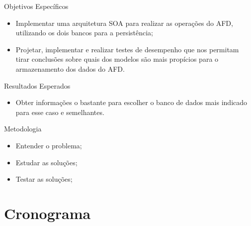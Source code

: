 \begin{frame}{Objetivos Específicos}
    \begin{itemize}
    \item Implementar uma arquitetura SOA para realizar as operações do AFD, utilizando os dois bancos para a persistência;
   \item Projetar, implementar e realizar testes de desempenho que nos permitam tirar conclusões sobre quais dos modelos são mais propícios para o armazenamento dos dados do AFD.
    \end{itemize}
\end{frame}

\begin{frame}{Resultados Esperados}
    \begin{itemize}
    \item Obter informações o bastante para escolher o banco de dados mais indicado para esse caso e semelhantes.
    \end{itemize}
\end{frame}


\begin{frame}{Metodologia}
    \begin{itemize}
    \item Entender o problema;
    \item Estudar as soluções;
    \item Testar as soluções;
    \end{itemize}
\end{frame}

\section{Cronograma}

\newenvironment{changemargin}[2]{%
  \begin{list}{}{%
    \setlength{\topsep}{0pt}%
    \setlength{\leftmargin}{#1}%
    \setlength{\rightmargin}{#2}%
    \setlength{\listparindent}{\parindent}%
    \setlength{\itemindent}{\parindent}%
    \setlength{\parsep}{\parskip}%
  }%
  \item[]}{\end{list}}


